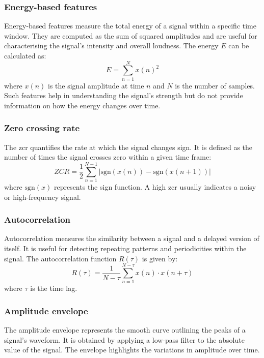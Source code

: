 \subsubsection{Energy-based features}
Energy-based features measure the total energy of a signal within a specific time window. They are computed as the sum of squared amplitudes and are useful for characterising the signal's intensity and overall loudness. The energy $E$ can be calculated as:
\begin{equation} E = \sum_{n=1}^{N} x(n)^2 \end{equation}
where $ x(n) $ is the signal amplitude at time $ n $ and $ N $ is the number of samples. Such features help in understanding the signal's strength but do not provide information on how the energy changes over time.

\subsubsection{Zero crossing rate}
The \acrfull{zcr} quantifies the rate at which the signal changes sign. It is defined as the number of times the signal crosses zero within a given time frame:
\begin{equation} ZCR = \frac{1}{2} \sum_{n=1}^{N-1} | \text{sgn}(x(n)) - \text{sgn}(x(n+1)) | \end{equation}
where $ \text{sgn}(x) $ represents the sign function. A high \acrlong{zcr} usually indicates a noisy or high-frequency signal.

\subsubsection{Autocorrelation}
Autocorrelation measures the similarity between a signal and a delayed version of itself. It is useful for detecting repeating patterns and periodicities within the signal. The autocorrelation function $ R(\tau) $ is given by:
\begin{equation} R(\tau) = \frac{1}{N-\tau} \sum_{n=1}^{N-\tau} x(n) \cdot x(n+\tau) \end{equation}
where $ \tau $ is the time lag.

\subsubsection{Amplitude envelope}
The amplitude envelope represents the smooth curve outlining the peaks of a signal's waveform. It is obtained by applying a low-pass filter to the absolute value of the signal. The envelope highlights the variations in amplitude over time.

